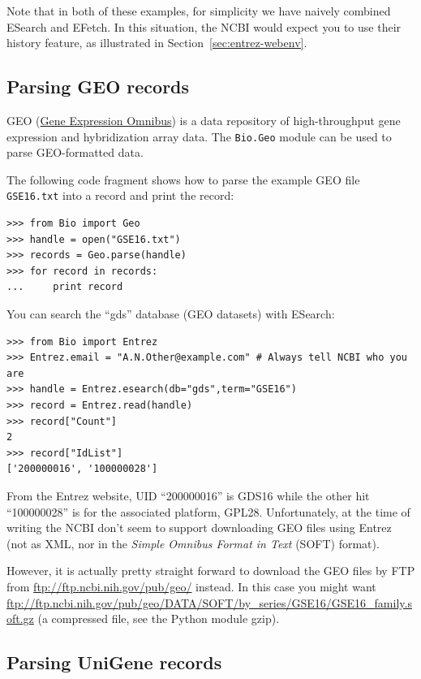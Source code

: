 \documentclass{report}
\begin{document}
Note that in both of these examples, for simplicity we have naively combined ESearch and EFetch.
In this situation, the NCBI would expect you to use their history feature,
as illustrated in Section~\ref{sec:entrez-webenv}.


\subsection{Parsing GEO records}

GEO (\href{http://www.ncbi.nlm.nih.gov/geo/}{Gene Expression Omnibus})
is a data repository of high-throughput gene expression and hybridization
array data. The \verb|Bio.Geo| module can be used to parse GEO-formatted
data.

The following code fragment shows how to parse the example GEO file
\verb|GSE16.txt| into a record and print the record:

\begin{verbatim}
>>> from Bio import Geo
>>> handle = open("GSE16.txt")
>>> records = Geo.parse(handle)
>>> for record in records:
...     print record
\end{verbatim}

You can search the ``gds'' database (GEO datasets) with ESearch:

\begin{verbatim}
>>> from Bio import Entrez
>>> Entrez.email = "A.N.Other@example.com" # Always tell NCBI who you are
>>> handle = Entrez.esearch(db="gds",term="GSE16")
>>> record = Entrez.read(handle)
>>> record["Count"]
2
>>> record["IdList"]
['200000016', '100000028']
\end{verbatim}

From the Entrez website, UID ``200000016'' is GDS16 while the other hit
``100000028'' is for the associated platform, GPL28.  Unfortunately, at the
time of writing the NCBI don't seem to support downloading GEO files using
Entrez (not as XML, nor in the \textit{Simple Omnibus Format in Text} (SOFT)
format).

However, it is actually pretty straight forward to download the GEO files by FTP
from \url{ftp://ftp.ncbi.nih.gov/pub/geo/} instead.  In this case you might want
\url{ftp://ftp.ncbi.nih.gov/pub/geo/DATA/SOFT/by_series/GSE16/GSE16_family.soft.gz}
(a compressed file, see the Python module gzip).

\subsection{Parsing UniGene records}
\end{document}
